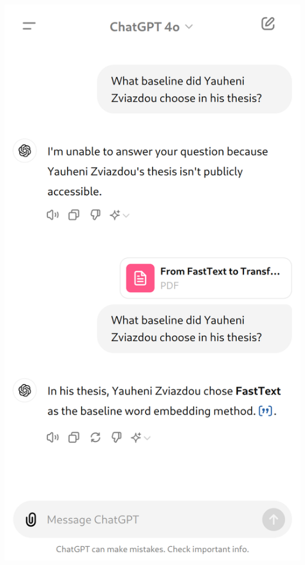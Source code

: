 \documentclass{beamer}
\begin{document}
\begin{frame}
\begin{columns}
\begin{column}{0.5\textwidth}
      \includegraphics[scale=0.15]{src/fig/imgs/RAG_example.png}
    \end{column}
  \end{columns}

  \newcommand{\tikzxmark}{%
  \tikz[scale=0.02] {
      \draw[line width=1.2,line cap=round] (0,0) to [bend left=6] (1,1);
      \draw[line width=1.2,line cap=round] (0.2,0.95) to [bend right=3] (0.8,0.05);
  }}
  \newcommand{\tikzcmark}{%
  \tikz[scale=0.02] {
      \draw[line width=1.2,line cap=round] (0.25,0) to [bend left=10] (1,1);
      \draw[line width=1.3,line cap=round] (0,0.35) to [bend right=1] (0.23,0);
  }}
\end{frame}
\end{document}
